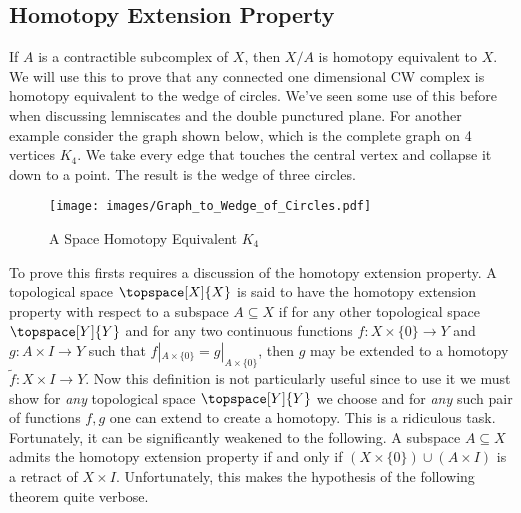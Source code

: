 \documentclass{book}                                                           %
\begin{document}
            \subsection{Homotopy Extension Property}
                If $A$ is a contractible subcomplex of $X$, then $X/A$ is
                homotopy equivalent to $X$. We will use this to prove that any
                connected one dimensional CW complex is homotopy equivalent to
                the wedge of circles. We've seen some use of this before when
                discussing lemniscates and the double punctured plane. For
                another example consider the graph shown below, which is the
                complete graph on 4 vertices $K_{4}$. We take every edge that
                touches the central vertex and collapse it down to a point. The
                result is the wedge of three circles.
                \begin{figure}[H]
                    \centering
                    \captionsetup{type=figure}
                    \texttt{[image: images/Graph\_to\_Wedge\_of\_Circles.pdf]}
                    \caption{A Space Homotopy Equivalent $K_{4}$}
                    \label{fig:Homotopy_Equivalent_to_K4}
                \end{figure}
                To prove this firsts requires a discussion of the homotopy
                extension property. A topological space $\topspace[X]{X}$ is
                said to have the homotopy extension property with respect to a
                subspace $A\subseteq{X}$ if for any other topological space
                $\topspace[Y]{Y}$ and for any two continuous functions
                $f:X\times\{0\}\rightarrow{Y}$ and $g:A\times{I}\rightarrow{Y}$
                such that $f|_{A\times\{0\}}=g|_{A\times\{0\}}$, then $g$ may be
                extended to a homotopy $\tilde{f}:X\times{I}\rightarrow{Y}$. Now
                this definition is not particularly useful since to use it we
                must show for \textit{any} topological space $\topspace[Y]{Y}$
                we choose and for \textit{any} such pair of functions $f,g$ one
                can extend to create a homotopy. This is a ridiculous task.
                Fortunately, it can be significantly weakened to the following.
                A subspace $A\subseteq{X}$ admits the homotopy extension
                property if and only if $(X\times\{0\})\cup(A\times{I})$ is a
                retract of $X\times{I}$. Unfortunately, this makes the
                hypothesis of the following theorem quite verbose.
\end{document}
